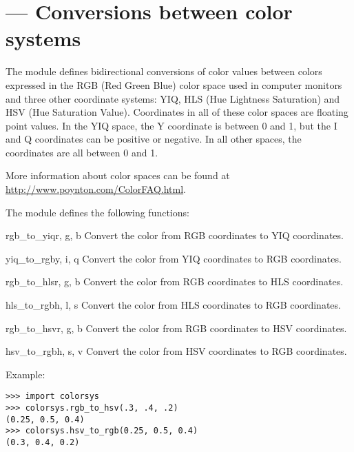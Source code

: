 \section{ ---
         Conversions between color systems}


The  module defines bidirectional conversions of
color values between colors expressed in the RGB (Red Green Blue)
color space used in computer monitors and three other coordinate
systems: YIQ, HLS (Hue Lightness Saturation) and HSV (Hue Saturation
Value).  Coordinates in all of these color spaces are floating point
values.  In the YIQ space, the Y coordinate is between 0 and 1, but
the I and Q coordinates can be positive or negative.  In all other
spaces, the coordinates are all between 0 and 1.

More information about color spaces can be found at 
\url{http://www.poynton.com/ColorFAQ.html}.

The  module defines the following functions:

\begin{funcdesc}{rgb_to_yiq}{r, g, b}
Convert the color from RGB coordinates to YIQ coordinates.
\end{funcdesc}

\begin{funcdesc}{yiq_to_rgb}{y, i, q}
Convert the color from YIQ coordinates to RGB coordinates.
\end{funcdesc}

\begin{funcdesc}{rgb_to_hls}{r, g, b}
Convert the color from RGB coordinates to HLS coordinates.
\end{funcdesc}

\begin{funcdesc}{hls_to_rgb}{h, l, s}
Convert the color from HLS coordinates to RGB coordinates.
\end{funcdesc}

\begin{funcdesc}{rgb_to_hsv}{r, g, b}
Convert the color from RGB coordinates to HSV coordinates.
\end{funcdesc}

\begin{funcdesc}{hsv_to_rgb}{h, s, v}
Convert the color from HSV coordinates to RGB coordinates.
\end{funcdesc}

Example:

\begin{verbatim}
>>> import colorsys
>>> colorsys.rgb_to_hsv(.3, .4, .2)
(0.25, 0.5, 0.4)
>>> colorsys.hsv_to_rgb(0.25, 0.5, 0.4)
(0.3, 0.4, 0.2)
\end{verbatim}
